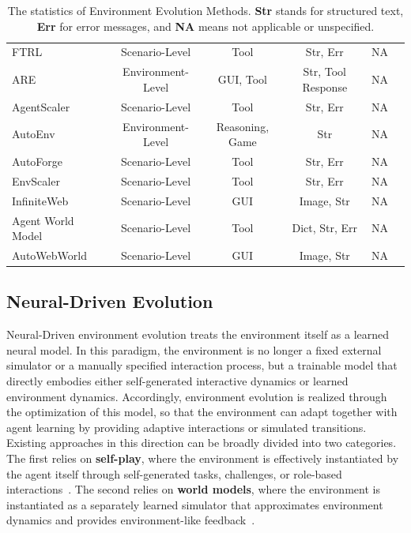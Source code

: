 \documentclass{llmxive}
\providecommand{\Yes}{\ding{51}}
\providecommand{\No}{\ding{55}}
\begin{document}
\begin{table}
{\begin{tabular}{lccccc}
FTRL~\cite{FTRL} & Scenario-Level & Tool & Str, Err & NA & \Yes \\
ARE~\cite{ARE} & Environment-Level & GUI, Tool & Str, Tool Response & NA & \No \\
AgentScaler~\cite{AgentScaler} & Scenario-Level & Tool & Str, Err & NA & \No \\
AutoEnv~\cite{AutoEnv} & Environment-Level & Reasoning, Game & Str & NA & \No \\
AutoForge~\cite{AutoForge} & Scenario-Level & Tool & Str, Err & NA & \No \\
EnvScaler~\cite{EnvScaler} & Scenario-Level & Tool & Str, Err & NA & \Yes \\
InfiniteWeb~\cite{InfiniteWeb} & Scenario-Level & GUI & Image, Str & NA & \Yes \\
Agent World Model~\cite{Agent_world_model} & Scenario-Level & Tool & Dict, Str, Err & NA & \Yes \\
AutoWebWorld~\cite{AutoWebWorld} & Scenario-Level & GUI & Image, Str & NA & \Yes \\

\bottomrule
\end{tabular}}
\caption{The statistics of Environment Evolution Methods. \textbf{Str} stands for structured text, \textbf{Err} for error messages, and \textbf{NA} means not applicable or unspecified.}
\end{table}
\subsection{Neural-Driven Evolution}\label{sec:neural_evo}
Neural-Driven environment evolution treats the environment itself as a learned neural model.
In this paradigm, the environment is no longer a fixed external simulator or a manually specified interaction process, but a trainable model that directly embodies either self-generated interactive dynamics or learned environment dynamics.
Accordingly, environment evolution is realized through the optimization of this model, so that the environment can adapt together with agent learning by providing adaptive interactions or simulated transitions.
Existing approaches in this direction can be broadly divided into two categories.
The first relies on \textbf{self-play}, where the environment is effectively instantiated by the agent itself through self-generated tasks, challenges, or role-based interactions~\cite{Absolute_zero,Self-Challenging,Vision-zero,SSR,Active_Zero}.
The second relies on \textbf{world models}, where the environment is instantiated as a separately learned simulator that approximates environment dynamics and provides environment-like feedback~\cite{Code2World,WebEvolver,WebWorld,WebDreamer,UI-Simulator,WAC}.
%
\end{document}
